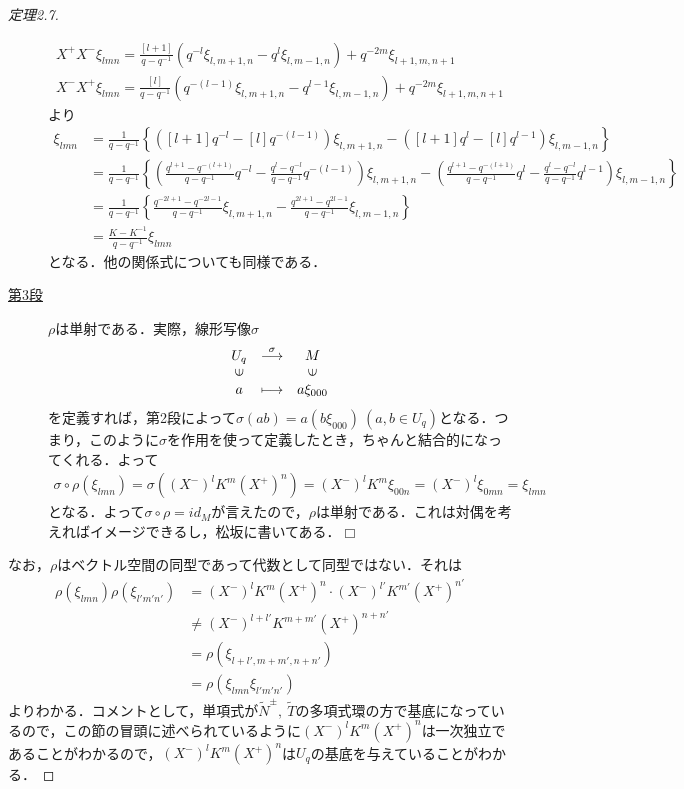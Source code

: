 \documentclass[dvipdfmx]{jsarticle}
\newtheorem{proof}{証明}
\def\qed{\hfill $\Box$}
\begin{document}
\begin{proof}[定理2.7]
\begin{description}
\begin{align*}
X^+X^-\xi_{lmn}=\frac{[l+1]}{q-q^{-1}}(q^{-l}\xi_{l,m+1,n}-q^{l}\xi_{l,m-1,n})+q^{-2m}\xi_{l+1,m,n+1} \\
X^-X^+\xi_{lmn}=\frac{[l]}{q-q^{-1}}(q^{-(l-1)}\xi_{l,m+1,n}-q^{l-1}\xi_{l,m-1,n})+q^{-2m}\xi_{l+1,m,n+1}
\end{align*}
より
\begin{align*}
[X^+,X^-]\xi_{lmn}
&=\frac{1}{q-q^{-1}}\left\{\left([l+1]q^{-l}-[l]q^{-(l-1)}\right)\xi_{l,m+1,n}-\left([l+1]q^{l}-[l]q^{l-1}\right)\xi_{l,m-1,n}\right\} \\
&{\!\!\!\!\!\!\!\!\!\!\!\!\!\!\!\!\!\!\!\!\!\!\!\!\!\!\!\!\!\!\!\!\!\!\!\!\!\!\!\!\!\!\!\!\!\!\!\!\!\!\!\!\!\!\!\!\!\!\!\!}=\frac{1}{q-q^{-1}}\left\{\left(\frac{q^{l+1}-q^{-(l+1)}}{q-q^{-1}}q^{-l}-\frac{q^{l}-q^{-l}}{q-q^{-1}}q^{-(l-1)}\right)\xi_{l,m+1,n}-\left(\frac{q^{l+1}-q^{-(l+1)}}{q-q^{-1}}q^{l}-\frac{q^{l}-q^{-l}}{q-q^{-1}}q^{l-1}\right)\xi_{l,m-1,n}\right\} \\
&=\frac{1}{q-q^{-1}}\left\{\frac{q^{-2l+1}-q^{-2l-1}}{q-q^{-1}}\xi_{l,m+1,n}-\frac{q^{2l+1}-q^{2l-1}}{q-q^{-1}}\xi_{l,m-1,n}\right\} \\
&=\frac{K-K^{-1}}{q-q^{-1}}\xi_{lmn}
\end{align*}
となる．他の関係式についても同様である．
\item[\underline{第3段}]
$\rho$は単射である．実際，線形写像$\sigma$
\begin{eqnarray*}
\begin{array}{ccc}
U_q & \stackrel{\sigma}{\longrightarrow} & M \\
\rotatebox{90}{$\in$} & & \rotatebox{90}{$\in$} \\
a & \longmapsto & a\xi_{000}
\end{array}
\end{eqnarray*}
を定義すれば，第2段によって$\sigma(ab)=a(b\xi_{000}){\ }(a,b\in U_q)$となる．つまり，このように$\sigma$を作用を使って定義したとき，ちゃんと結合的になってくれる．よって
\begin{align*}
\sigma\circ\rho(\xi_{lmn})=\sigma((X^-)^lK^m(X^+)^n)=(X^-)^lK^m\xi_{00n}=(X^-)^l\xi_{0mn}=\xi_{lmn}
\end{align*}
となる．よって$\sigma\circ\rho=id_{M}$が言えたので，$\rho$は単射である．これは対偶を考えればイメージできるし，松坂に書いてある．\qed
\end{description}
なお，$\rho$はベクトル空間の同型であって代数として同型ではない．それは
\begin{align*}
\rho(\xi_{lmn})\rho(\xi_{l'm'n'})
&=(X^-)^lK^m(X^+)^n\cdot (X^-)^{l'}K^{m'}(X^+)^{n'} \\
&\neq (X^-)^{l+l'}K^{m+m'}(X^+)^{n+n'} \\
&=\rho(\xi_{l+l',m+m',n+n'}) \\
&=\rho(\xi_{lmn}\xi_{l'm'n'})
\end{align*}
よりわかる．コメントとして，単項式が$\widetilde{N}^\pm,{\ }\widetilde{T}$の多項式環の方で基底になっているので，この節の冒頭に述べられているように$(X^-)^lK^m(X^+)^n$は一次独立であることがわかるので，$(X^-)^lK^m(X^+)^n$は$U_q$の基底を与えていることがわかる．
\end{proof}
%
%
%
%
\end{document}
